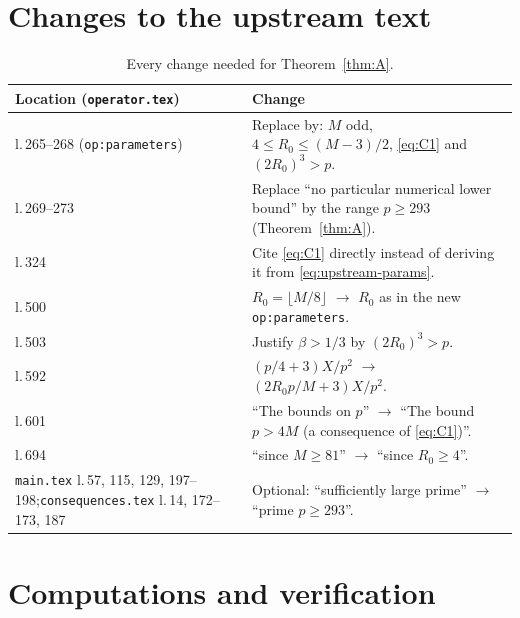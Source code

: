 \documentclass[11pt]{amsart}
\numberwithin{equation}{section}
\theoremstyle{definition}
\theoremstyle{remark}
\newcommand{\up}[1]{\texttt{#1}}
\begin{document}
\section{Changes to the upstream text}

\begin{table}[!htbp]
\centering
\small
\begin{tabularx}{\textwidth}{@{}>{\raggedright\arraybackslash}p{} X@{}}
\toprule
Location (\up{operator.tex}) & Change \\
\midrule
l.\,265--268 (\up{op:parameters}) & Replace by: $M$ odd, $4\le R_0\le(M-3)/2$, \eqref{eq:C1} and $(2R_0)^3>p$. \\
l.\,269--273 & Replace ``no particular numerical lower bound'' by the range $p\ge293$ (Theorem~\ref{thm:A}). \\
l.\,324 & Cite \eqref{eq:C1} directly instead of deriving it from \eqref{eq:upstream-params}. \\
l.\,500 & $R_0=\lfloor M/8\rfloor$ $\to$ $R_0$ as in the new \up{op:parameters}. \\
l.\,503 & Justify $\beta>1/3$ by $(2R_0)^3>p$. \\
l.\,592 & $(p/4+3)X/p^2$ $\to$ $(2R_0p/M+3)X/p^2$. \\
l.\,601 & ``The bounds on $p$'' $\to$ ``The bound $p>4M$ (a consequence of \eqref{eq:C1})''. \\
l.\,694 & ``since $M\ge81$'' $\to$ ``since $R_0\ge4$''. \\
\midrule
\up{main.tex} l.\,57, 115, 129, 197--198;\newline \up{consequences.tex} l.\,14, 172--173, 187 & Optional: ``sufficiently large prime'' $\to$ ``prime $p\ge293$''. \\
\bottomrule
\end{tabularx}
\caption{Every change needed for Theorem~\ref{thm:A}.}
\label{tab:changes}
\end{table}

\section{Computations and verification}
\end{document}
